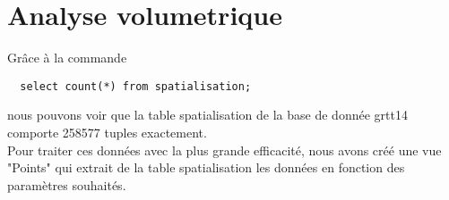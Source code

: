 \chapter{Analyse volumetrique}

Grâce à la commande \begin{verbatim}
  select count(*) from spatialisation;
\end{verbatim} nous pouvons voir que la table spatialisation de la base de donnée grtt14 comporte 258577 tuples exactement. \\
Pour traiter ces données avec la plus grande efficacité, nous avons créé une vue "Points" qui extrait de la table spatialisation les données en fonction des paramètres souhaités.
